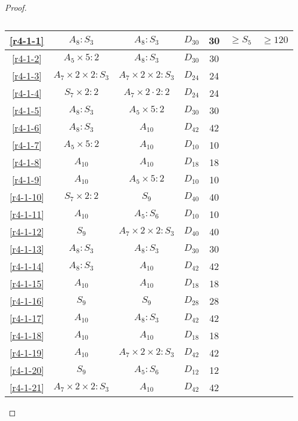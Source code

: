 \begin{proof}
\begin{table}[H]
\begin{tabular}{|c|c|c|c|c|c|c|}
    \ref{r4-1-1} & $A_8 : S_3$ & $A_8 : S_3$ & $D_{30}$ & 30 & $\ge S_5$ & $\ge 120$ \\ \hline
    \ref{r4-1-2} & $A_5 \times 5 : 2$ & $A_8 : S_3$ & $D_{30}$ & 30 &  \\ \hline
    \ref{r4-1-3} & $A_7 \times 2 \times 2 : S_3$ & $A_7 \times 2 \times 2 : S_3$ & $D_{24}$ & 24 &  \\ \hline
    \ref{r4-1-4} & $S_7 \times 2 : 2$ & $A_7  \times 2 \cdot 2 : 2$ & $D_{24}$ & 24 &  \\ \hline
    \ref{r4-1-5} & $A_8 : S_3$ & $A_5 \times 5 : 2$ & $D_{30}$ & 30 &  \\ \hline
    \ref{r4-1-6} & $A_8 : S_3$ & $A_{10}$ & $D_{42}$ & 42 &  \\ \hline
    \ref{r4-1-7} & $A_5 \times 5 : 2$ & $A_{10}$ & $D_{10}$ & 10 &  \\ \hline
    \ref{r4-1-8} & $A_{10}$ & $A_{10}$ & $D_{18}$ & 18 &  \\ \hline
    \ref{r4-1-9} & $A_{10}$ & $A_5 \times 5 : 2$ & $D_{10}$ & 10 &  \\ \hline
    \ref{r4-1-10}& $S_7 \times 2:2$ & $S_9$ & $D_{40}$ & 40 &  \\ \hline
    \ref{r4-1-11}& $A_{10}$ & $A_5 : S_6$ & $D_{10}$ & 10 &  \\ \hline
    \ref{r4-1-12}& $S_9$ & $A_7 \times 2 \times 2:S_3$ & $D_{40}$ & 40 &  \\ \hline
    \ref{r4-1-13}& $A_8 : S_3$ & $A_8 : S_3$ & $D_{30}$ & 30 & \\ \hline
    \ref{r4-1-14}& $A_8 : S_3$ & $A_{10}$ & $D_{42}$ & 42 & \\ \hline
    \ref{r4-1-15}& $A_{10}$ & $A_{10}$ & $D_{18}$ & 18 & \\ \hline
    \ref{r4-1-16}& $S_9$ & $S_9$ & $D_{28}$ & 28 & \\ \hline
    \ref{r4-1-17}& $A_{10}$ & $A_8 : S_3$ & $D_{42}$ & 42 & \\ \hline
    \ref{r4-1-18}& $A_{10}$ & $A_{10}$ & $D_{18}$ & 18 & \\ \hline
    \ref{r4-1-19}& $A_{10}$ & $A_7 \times 2 \times 2 : S_3$ & $D_{42}$ & 42 & \\ \hline
    \ref{r4-1-20}& $S_9$ & $A_5 : S_6$ & $D_{12}$ & 12 & \\ \hline
    \ref{r4-1-21}& $A_7 \times 2 \times 2 : S_{3}$ & $A_{10}$ & $D_{42}$ & 42 & \\ \hline

  \end{tabular}
  \caption{}
\end{table}


\end{proof}
